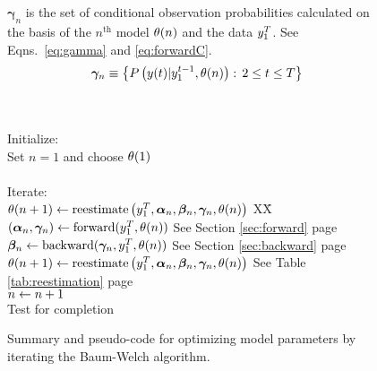 \begin{figure}[htbp]
\begin{center}
{\begin{minipage}{0.90\textwidth}
\begin{tabbing}
\begin{minipage}[b]{1.0\textwidth}
\begin{equation*}
         \end{equation*}
      \end{minipage}\\ \\%
      \begin{minipage}[b]{1.0\textwidth}
         $\bm{\gamma}_n$ is the set of conditional observation probabilities
         calculated on the basis of the $n^{\text{th}}$ model ${\theta}{(n)}$ and
         the data $y_{1}^{T}$.  See Eqns.~\eqref{eq:gamma} and
         \eqref{eq:forwardC}.
         \begin{equation*}
         \bm{\gamma}_n \equiv \left\{P \left({y}{(t)} | y_{1}^{t-1},
         {\theta}{(n)}\right) : \, 2 \leq t \leq T \right\}
         \end{equation*}
      \end{minipage}\\ \\%
      \<\-
      Initialize: \> \+ \\
      Set $n=1$ and choose ${\theta}{(1)}$\\ \\ \< \-
      Iterate: \> \+ \\
      ${\theta}{(n+1)} \leftarrow \text{reestimate} \left( y_{1}^{T},
      \bm{\alpha}_n, \bm{\beta}_n, \bm{\gamma}_n, {\theta}{(n)}\right)$ XX\= \kill
      $\left(\bm{\alpha}_n,\bm{\gamma}_n\right) \leftarrow
      \text{forward}(y_{1}^{T},{\theta}{(n)})$ \> See Section
      \ref{sec:forward} page \pageref{sec:forward}\\
      $\bm{\beta}_n \leftarrow \text{backward}(\bm{\gamma}_n, y_{1}^{T},
      {\theta}{(n)})$ \> See Section \ref{sec:backward}  page \pageref{sec:backward}\\
      ${\theta}{(n+1)} \leftarrow \text{reestimate} \left( y_{1}^{T},
      \bm{\alpha}_n, \bm{\beta}_n, \bm{\gamma}_n, {\theta}{(n)}\right)$ \> See Table
      \ref{tab:reestimation} page \pageref{tab:reestimation} \\
      $n \leftarrow n+1$ \\
      Test for completion
    \end{tabbing}
  \end{minipage}
}
\caption[Baum-Welch model parameter optimization.]%
{Summary and pseudo-code for optimizing model parameters by iterating
  the Baum-Welch algorithm. }
    \label{fig:train}
  \end{center}
\end{figure}

